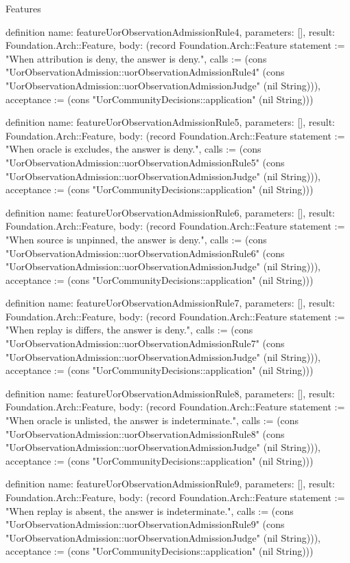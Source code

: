 \begin{lexlean}{Features}
\begin{semanticmodule}
definition{
  name: featureUorObservationAdmissionRule4,
  parameters: [],
  result: Foundation.Arch::Feature,
  body: (record Foundation.Arch::Feature {statement := "When attribution is deny, the answer is deny.", calls := (cons "UorObservationAdmission::uorObservationAdmissionRule4" (cons "UorObservationAdmission::uorObservationAdmissionJudge" (nil String))), acceptance := (cons "UorCommunityDecisions::application" (nil String))})
}

definition{
  name: featureUorObservationAdmissionRule5,
  parameters: [],
  result: Foundation.Arch::Feature,
  body: (record Foundation.Arch::Feature {statement := "When oracle is excludes, the answer is deny.", calls := (cons "UorObservationAdmission::uorObservationAdmissionRule5" (cons "UorObservationAdmission::uorObservationAdmissionJudge" (nil String))), acceptance := (cons "UorCommunityDecisions::application" (nil String))})
}

definition{
  name: featureUorObservationAdmissionRule6,
  parameters: [],
  result: Foundation.Arch::Feature,
  body: (record Foundation.Arch::Feature {statement := "When source is unpinned, the answer is deny.", calls := (cons "UorObservationAdmission::uorObservationAdmissionRule6" (cons "UorObservationAdmission::uorObservationAdmissionJudge" (nil String))), acceptance := (cons "UorCommunityDecisions::application" (nil String))})
}

definition{
  name: featureUorObservationAdmissionRule7,
  parameters: [],
  result: Foundation.Arch::Feature,
  body: (record Foundation.Arch::Feature {statement := "When replay is differs, the answer is deny.", calls := (cons "UorObservationAdmission::uorObservationAdmissionRule7" (cons "UorObservationAdmission::uorObservationAdmissionJudge" (nil String))), acceptance := (cons "UorCommunityDecisions::application" (nil String))})
}

definition{
  name: featureUorObservationAdmissionRule8,
  parameters: [],
  result: Foundation.Arch::Feature,
  body: (record Foundation.Arch::Feature {statement := "When oracle is unlisted, the answer is indeterminate.", calls := (cons "UorObservationAdmission::uorObservationAdmissionRule8" (cons "UorObservationAdmission::uorObservationAdmissionJudge" (nil String))), acceptance := (cons "UorCommunityDecisions::application" (nil String))})
}

definition{
  name: featureUorObservationAdmissionRule9,
  parameters: [],
  result: Foundation.Arch::Feature,
  body: (record Foundation.Arch::Feature {statement := "When replay is absent, the answer is indeterminate.", calls := (cons "UorObservationAdmission::uorObservationAdmissionRule9" (cons "UorObservationAdmission::uorObservationAdmissionJudge" (nil String))), acceptance := (cons "UorCommunityDecisions::application" (nil String))})
}


\end{semanticmodule}
\end{lexlean}
